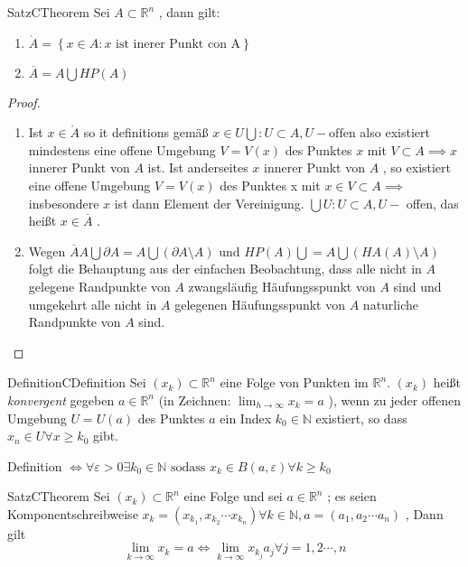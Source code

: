 \documentclass[11.5 pt, a4paper]{memoir}
\begin{document}
\begin{ibox}[8]{Satz}{CTheorem}
    Sei $ A \subset \mathbb{R}^n $ , dann gilt:
	\begin{enumerate}[label=\alph*)]
		\item $ \mathring{A} = \left\{ x \in A : x \text{ ist inerer Punkt con A} \right\}  $ 
		\item $ \overline{A} = A \bigcup HP(A) $ 
 	\end{enumerate}
\end{ibox}
\begin{proof}
	\begin{enumerate}[label=\alph*)]
		\item Ist $ x \in \mathring{A} $ so it definitions gemäß $ x \in U \bigcup : U \subset A, U-\text{offen} $ 
			also existiert mindestens eine offene Umgebung $ V = V(x) $ des Punktes $ x  $ mit $ V \subset A \implies x $ innerer Punkt
			von $ A $ ist. Ist anderseites $ x $ innerer Punkt von $ A $ , so existiert eine offene Umgebung $ V = V(x) $ des 
			Punktes x mit $ x \in V \subset A \implies $ insbesondere $ x  $ ist dann Element der Vereinigung. 
			$ \bigcup U : U \subset A, U- $ offen, das heißt $ x \in \overline{A} $ .
		\item Wegen $ \overline{A} A \bigcup \partial A = A \bigcup \left( \partial A \setminus A \right) \text{ und } HP(A) \bigcup 
			= A \bigcup (HA(A)\setminus A) $  folgt die Behauptung aus der einfachen Beobachtung, dass alle nicht in $ A $ gelegene
			Randpunkte von $ A $ zwangsläufig Häufungsspunkt von $ A $ sind und umgekehrt alle nicht in $ A $ gelegenen Häufungsspunkt 
			von $ A $ naturliche Randpunkte von $ A $ sind. 
	\end{enumerate}
	 
\end{proof}
\begin{ibox}{Definition}{CDefinition}
    Sei $ \left( x_k \right) \subset \mathbb{R}^n $ eine Folge von Punkten im $ \mathbb{R}^n $. $ (x_k) $ heißt \textit{konvergent}
	gegeben $ a \in \mathbb{R}^n $ (in Zeichnen: $ \lim_{h \to \infty} x_k = a$ ), wenn zu jeder offenen Umgebung $ U = U(a) $ des 
	Punktes $ a $ ein Index $ k_0 \in \mathbb{N}$ existiert, so dass $ x_n \in U \forall x \geq k_0$ gibt. 
\end{ibox}
Definition $ \iff \forall \varepsilon > 0 \exists k_0 \in \mathbb{N} \text{ sodass } x_k \in B(a, \varepsilon)	\forall k \geq k_0 $ 
\begin{ibox}[9]{Satz}{CTheorem}
    Sei $ \left( x_k \right) \subset \mathbb{R}^n $ eine Folge und sei $ a \in \mathbb{R}^n $ ; es seien Komponentschreibweise 
$ x_k = \left( x_{k_1}, x_{k_2} \cdots x_{k_n} \right) \forall k \in \mathbb{N}, a = (a_1,a_2 \cdots a_{n})  $ , Dann gilt 
$$ \lim_{k \to \infty} x_{k} = a \iff \lim_{k \to \infty}x_{k_{j}} a_{j} \forall j = 1,2 \cdots, n$$
\end{ibox}
\end{document}
